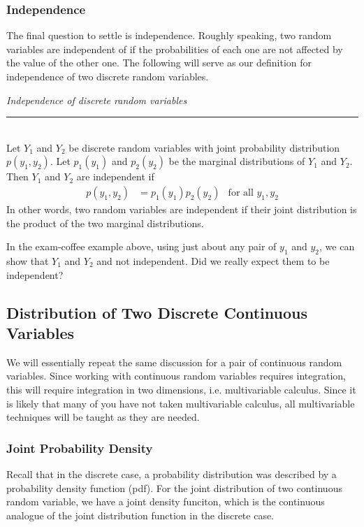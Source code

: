 \documentclass[12pt]{article}
\theoremstyle{definition}
\theoremstyle{remark}
\begin{document}
\subsubsection{Independence}
The final question to settle is independence. Roughly speaking, two random variables are independent of if the probabilities of each one are not affected by the value of the other one. The following will serve as our definition for independence of two discrete random variables.

\begin{framed}
\emph{Independence of discrete random variables}\\
  \rule{\dimexpr{}\fboxrule}{.1pt} \\
Let $Y_1$ and $Y_2$ be discrete random variables with joint probability distribution $p(y_1, y_2)$. Let $p_1(y_1)$ and $p_2(y_2)$ be the marginal distributions of $Y_1$ and $Y_2$. Then $Y_1$ and $Y_2$ are independent if
\begin{align*}
p(y_1, y_2) &= p_1(y_1)p_2(y_2) & \text{for all }y_1, y_2
\end{align*}
In other words, two random variables are independent if their joint distribution is the product of the two marginal distributions.
\end{framed}

In the exam-coffee example above, using just about any pair of $y_1$ and $y_2$, we can show that $Y_1$ and $Y_2$ and not independent. Did we really expect them to be independent?

\subsection{Distribution of Two Discrete Continuous Variables}
We will essentially repeat the same discussion for a pair of continuous random variables. Since working with continuous random variables requires integration, this will require integration in two dimensions, i.e. multivariable calculus. Since it is likely that many of you have not taken multivariable calculus, all multivariable techniques will be taught as they are needed.

\subsubsection{Joint Probability Density}
Recall that in the discrete case, a probability distribution was described by a probability density function (pdf). For the joint distribution of two continuous random variable, we have a joint density funciton, which is the continuous analogue of the joint distribution function in the discrete case.
\end{document}
